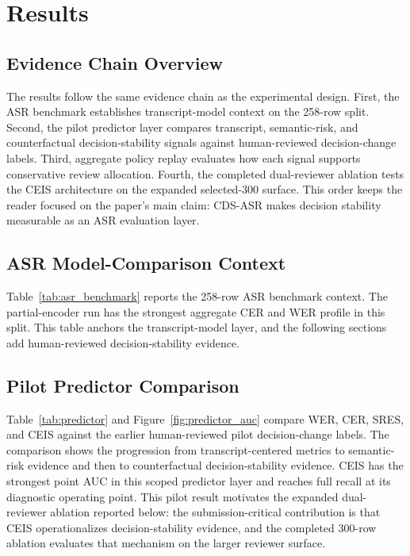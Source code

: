 \section{Results}

\subsection{Evidence Chain Overview}

The results follow the same evidence chain as the experimental design. First, the ASR benchmark establishes transcript-model context on the 258-row split. Second, the pilot predictor layer compares transcript, semantic-risk, and counterfactual decision-stability signals against human-reviewed decision-change labels. Third, aggregate policy replay evaluates how each signal supports conservative review allocation. Fourth, the completed dual-reviewer ablation tests the CEIS architecture on the expanded selected-300 surface. This order keeps the reader focused on the paper's main claim: CDS-ASR makes decision stability measurable as an ASR evaluation layer.

\subsection{ASR Model-Comparison Context}

Table~\ref{tab:asr_benchmark} reports the 258-row ASR benchmark context. The partial-encoder run has the strongest aggregate CER and WER profile in this split. This table anchors the transcript-model layer, and the following sections add human-reviewed decision-stability evidence.



\subsection{Pilot Predictor Comparison}

Table~\ref{tab:predictor} and Figure~\ref{fig:predictor_auc} compare WER, CER, SRES, and CEIS against the earlier human-reviewed pilot decision-change labels. The comparison shows the progression from transcript-centered metrics to semantic-risk evidence and then to counterfactual decision-stability evidence. CEIS has the strongest point AUC in this scoped predictor layer and reaches full recall at its diagnostic operating point. This pilot result motivates the expanded dual-reviewer ablation reported below: the submission-critical contribution is that CEIS operationalizes decision-stability evidence, and the completed 300-row ablation evaluates that mechanism on the larger reviewer surface.

